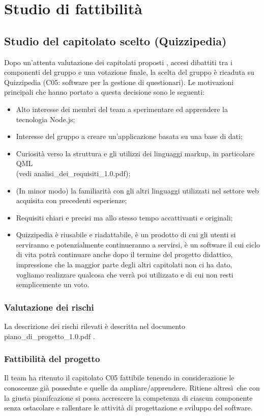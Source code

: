 \documentclass[a4paper,11pt]{article}
\begin{document}
\newpage

\section{Studio di fattibilità}


\subsection{Studio del capitolato scelto (Quizzipedia)}

Dopo un'attenta valutazione dei capitolati proposti , accesi dibattiti tra i componenti del gruppo e una votazione finale, la scelta del gruppo è ricaduta su Quizzipedia (C05: software per la gestione di questionari). Le motivazioni principali che hanno portato a questa decisione sono le seguenti:
\begin{itemize}
\item Alto interesse dei membri del team a sperimentare ed apprendere la tecnologia Node.js;
\item Interesse del gruppo a creare un'applicazione basata su una base di dati;
\item Curiosità verso la struttura e gli utilizzi dei linguaggi markup, in particolare QML \\(vedi analisi\_dei\_requisiti\_1.0.pdf);
\item (In minor modo) la familiarità con gli altri linguaggi utilizzati nel settore web acquisita con precedenti esperienze;
\item Requisiti chiari e precisi ma allo stesso tempo accattivanti e originali;
\item Quizzipedia è riusabile e riadattabile, è un prodotto di cui gli utenti si serviranno e potenzialmente continueranno a servirsi, è un software il cui ciclo di vita potrà continuare anche dopo il termine del progetto didattico, impressione che la maggior parte degli altri capitolati non ci ha dato, vogliamo realizzare qualcosa che verrà poi utilizzato e di cui non resti semplicemente un voto.
\end{itemize}

\subsubsection{Valutazione dei rischi}
La descrizione  dei rischi rilevati \`e descritta nel documento piano\_di\_progetto\_1.0.pdf .

\subsubsection{Fattibilit\`a del progetto}
Il team ha ritenuto il capitolato C05 fattibile tenendo in considerazione le conoscenze gi\`a possedute e quelle da ampliare/apprendere.  Ritiene altres\`i\  che con la giusta pianifcazione si possa accrescere la competenza di ciascun componente senza ostacolare e rallentare le attivit\`a di progettazione e sviluppo del software.
\end{document}
